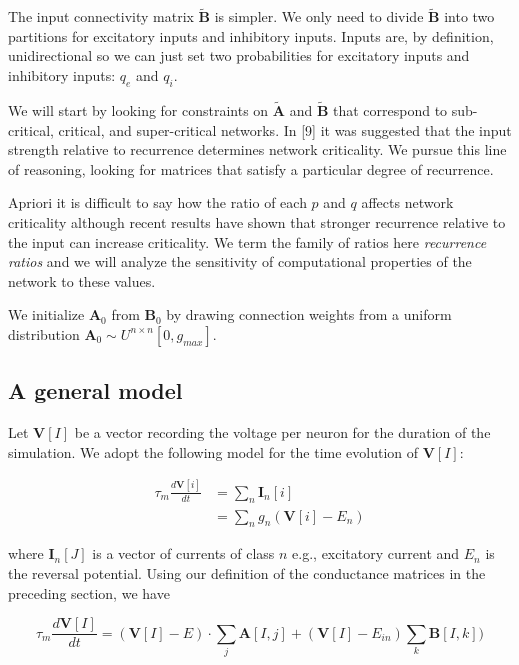 \documentclass{article} %
\begin{document}
The input connectivity matrix $\tilde{\mathbf{B}}$ is simpler. We only need to divide  $\tilde{\mathbf{B}}$ into two partitions for excitatory inputs and inhibitory inputs. Inputs are, by definition, unidirectional so we can just set two probabilities for excitatory inputs and inhibitory inputs: $q_{e}$ and $q_{i}$.

We will start by looking for constraints on $\tilde{\mathbf{A}}$ and $\tilde{\mathbf{B}}$ that correspond to sub-critical, critical, and super-critical networks. In [9] it was suggested that the input strength relative to recurrence determines network criticality. We pursue this line of reasoning, looking for matrices that satisfy a particular degree of recurrence.

Apriori it is difficult to say how the ratio of each $p$ and $q$ affects network criticality although recent results have shown that stronger recurrence relative to the input can increase criticality. We term the family of ratios here \emph{recurrence ratios} and we will analyze the sensitivity of computational properties of the network to these values.




We initialize $\mathbf{A}_{0}$ from  $\mathbf{B}_{0}$ by drawing connection weights from a uniform distribution $\mathbf{A}_{0}\sim U^{n\times n}[0,g_{max}]$. 


\subsection{A general model}

Let $\mathbf{V}[I]$ be a vector recording the voltage per neuron for the duration of the simulation. We adopt the following model for the time evolution of $\mathbf{V}[I]$:

\begin{align*}
\tau_{m}\frac{d\mathbf{V}[i]}{dt} &= \sum_{n} \mathbf{I}_{n}[i]\\
&=  \sum_{n} g_{n}(\mathbf{V}[i] - E_{n})
\end{align*}

where $\mathbf{I}_{n}[J]$ is a vector of currents of class $n$ e.g., excitatory current and $E_{n}$ is the reversal potential. Using our definition of the conductance matrices in the preceding section, we have

\begin{equation}
\tau_{m}\frac{d\mathbf{V}[I]}{dt} = (\mathbf{V}[I]-E)\cdot \sum_{j} \mathbf{A}[I,j] + (\mathbf{V}[I] - E_{in})\sum_{k}\mathbf{B}[I,k])
\end{equation}
\end{document}
